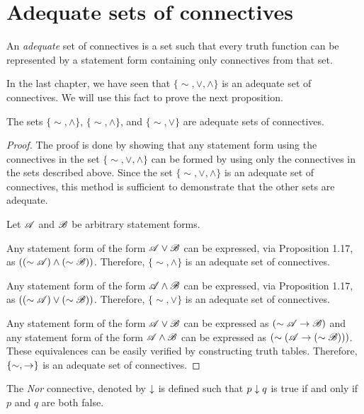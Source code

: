\section{Adequate sets of connectives}
\setcounter{definition}{22}
\begin{definition}
  An \textit{adequate} set of connectives is a set such that every truth function can be represented by a statement form containing only connectives from that set.
\end{definition}

In the last chapter, we have seen that \(\{\sim, \lor, \land\}\) is an adequate set of connectives. We will use this fact to prove the next proposition.

\begin{proposition}
  The sets \(\{\sim, \land\}\), \(\{\sim, \land\}\), and \(\{\sim, \lor\}\) are adequate sets of connectives.

  \begin{proof}
    The proof is done by showing that any statement form using the connectives in the set \(\{\sim, \lor, \land\}\) can be formed by using only the connectives in the sets described above. Since the set \(\{\sim, \lor, \land\}\) is an adequate set of connectives, this method is sufficient to demonstrate that the other sets are adequate.

    Let \(\mathscr{A}\) and \(\mathscr{B}\) be arbitrary statement forms. 

    Any statement form of the form \(\mathscr{A} \lor \mathscr{B}\) can be expressed, via Proposition 1.17, as \(((\sim\mathscr{A}) \land (\sim\mathscr{B}))\). Therefore, \(\{\sim, \land\}\) is an adequate set of connectives.

    Any statement form of the form \(\mathscr{A} \land \mathscr{B}\) can be expressed, via Proposition 1.17, as \(((\sim\mathscr{A}) \lor (\sim\mathscr{B}))\). Therefore, \(\{\sim, \lor\}\) is an adequate set of connectives.

    Any statement form of the form \(\mathscr{A} \lor \mathscr{B}\) can be expressed as \((\sim\mathscr{A} \rightarrow \mathscr{B})\) and any statement form of the form \(\mathscr{A} \land \mathscr{B}\) can be expressed as \((\sim(\mathscr{A} \rightarrow (\sim \mathscr{B})))\). These equivalences can be easily verified by constructing truth tables. Therefore, \(\{\sim, \rightarrow\}\) is an adequate set of connectives.
  \end{proof}
\end{proposition}

The \textit{Nor} connective, denoted by \(\downarrow\) is defined such that \(p \downarrow q\) is true if and only if \(p\) and \(q\) are both false.

